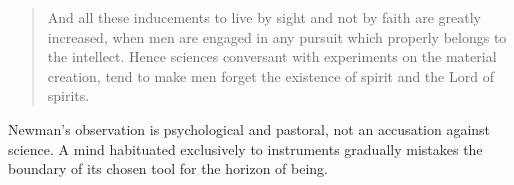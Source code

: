 \begin{quote}
And all these inducements to live by sight and not by faith are greatly increased, when men are engaged in any pursuit which properly belongs to the intellect. Hence sciences conversant with experiments on the material creation, tend to make men forget the existence of spirit and the Lord of spirits.
\end{quote}

Newman's observation is psychological and pastoral, not an accusation against science. A mind habituated exclusively to instruments gradually mistakes the boundary of its chosen tool for the horizon of being.
